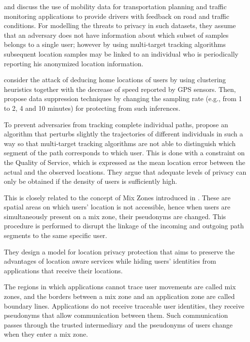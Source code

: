 \documentclass[times,twocolumn,final,authoryear]{elsarticle}
\begin{document}
\cite{Hoh2005} and \cite{Hoh06} discuss the use of mobility data for transportation planning and traffic monitoring applications to provide drivers with feedback on road and traffic conditions.
For modelling the threats to privacy in such datasets, they assume that an adversary does not have information about which subset of samples belongs to a single user; 
however by using multi-target tracking algorithms \citep{Reid79analgorithm} subsequent location samples may be linked to an individual who is periodically reporting his anonymized location information.

\cite{Hoh06} consider the attack of deducing home locations of users by using clustering heuristics together with the decrease of speed reported by GPS sensors. Then, propose data suppression techniques by changing the sampling rate (e.g., from 1 to 2, 4 and 10 minutes) for protecting from such inferences.

To prevent adversaries from tracking complete individual paths, \cite{Hoh2005} propose an algorithm that perturbs slightly the trajectories of different individuals in such a way so that multi-target tracking algorithms are not able to distinguish which segment of the path corresponds to which user.
This is done with a constraint on the Quality of Service, which is expressed as the mean location error between the actual and the observed locations. They argue that adequate levels of privacy can only be obtained if the density of users is sufficiently high.


This is closely related to the concept of Mix Zones introduced in \cite{Beresford2003}. These are spatial areas on which users' location is not accessible, hence when users are simultaneously present on a mix zone, their pseudonyms are changed. This procedure is performed to disrupt the linkage of the incoming and outgoing path segments to the same specific user.

They design a model for location privacy protection that aims to preserve the advantages of location aware services while hiding users' identities from applications that receive their locations.


The regions in which applications cannot trace user movements are called mix zones, and the borders between a mix zone and an application zone are called boundary lines.
Applications do not receive traceable user identities, they receive pseudonyms that allow communication between them. Such communication passes through the trusted intermediary and the pseudonyms of users change when they enter a mix zone.
\end{document}
